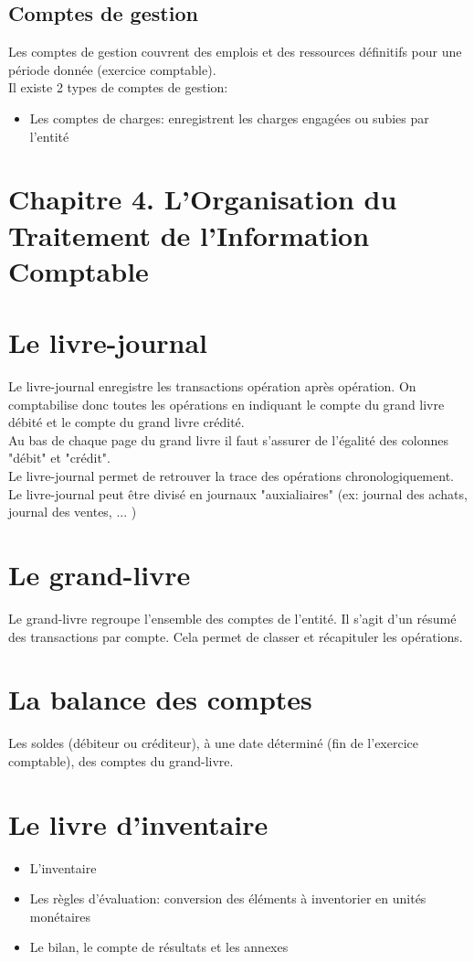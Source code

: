 \documentclass{article}
\begin{document}
\subsection{Comptes de gestion}
Les comptes de gestion couvrent des emplois et des ressources définitifs pour une période donnée (exercice comptable). \\
Il existe 2 types de comptes de gestion:
\begin{itemize}
    \item Les comptes de charges: enregistrent les charges engagées ou subies par l'entité
\end{itemize}

\section*{Chapitre 4. L'Organisation du Traitement de l'Information Comptable}
\section{Le livre-journal}
Le livre-journal enregistre les transactions opération après opération. On comptabilise donc toutes les opérations en indiquant le compte du grand livre débité et le compte du grand livre crédité. \\
Au bas de chaque page du grand livre il faut s'assurer de l'égalité des colonnes "débit" et "crédit".\\
Le livre-journal permet de retrouver la trace des opérations chronologiquement. \\
Le livre-journal peut être divisé en journaux "auxialiaires" (ex: journal des achats, journal des ventes, ... )
\section{Le grand-livre}
Le grand-livre regroupe l'ensemble des comptes de l'entité. Il s'agit d'un résumé des transactions par compte. Cela permet de classer et récapituler les opérations. \\
\section{La balance des comptes}
Les soldes (débiteur ou créditeur), à une date
déterminé (fin de l’exercice comptable), des
comptes du grand-livre.
\section{Le livre d'inventaire}
\begin{itemize}
    \item L'inventaire
    \item Les règles d’évaluation: conversion des éléments à inventorier en unités monétaires 
    \item Le bilan, le compte de résultats et les annexes
\end{itemize}
\end{document}
